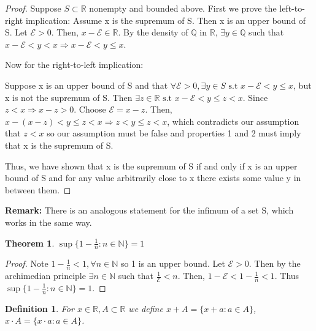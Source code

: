 \documentclass[12pt]{article}
\newtheorem{theorem}{Theorem}
\newtheorem{definition}{Definition}
\begin{document}
\begin{proof}
    Suppose \(S \subset \mathbb R\) nonempty and bounded above.  
    First we prove the left-to-right implication:
    Assume x is the supremum of S. Then x is an upper bound of S.  
    Let \(\mathcal E > 0\). Then, 
    \(x - \mathcal E \in \mathbb R\). By the density of \(\mathbb Q\) in \(\mathbb R\), 
    \(\exists y \in \mathbb Q\) such that \(x- \mathcal E < y < x \Rightarrow 
    x - \mathcal E < y \leq x\). 

    \noindent 
    Now for the right-to-left implication: 

    \noindent 
    Suppose x is an upper bound of S and that \(\forall \mathcal E > 0, 
    \exists y \in S \text{ s.t } x - \mathcal E < y \leq x\), but x is not the supremum 
    of S. Then \(\exists z \in \mathbb R \text{ s.t } x-\mathcal E < y \leq z < x\).
    Since \(z < x \Rightarrow x - z > 0\). Choose \(\mathcal E = x-z\). 
    Then, \(x-(x-z) < y \leq z < x \Rightarrow z < y \leq z < x\), which contradicts 
    our assumption that \(z < x\) so our assumption must be false and properties 
    1 and 2 must imply that x is the supremum of S.

    \noindent 
    Thus, we have shown that x is the supremum of S if and only if 
    x is an upper bound of S and for any value arbitrarily close to x there exists 
    some value y in between them.
    
\end{proof}

\noindent 
\textbf{Remark:}
There is an analogous statement for the infimum of a set S, which works in the same way.

\break
\begin{theorem}
    \(\sup\{1-\frac{1}{n} : n \in \mathbb N\} = 1\)
\end{theorem}

\begin{proof}
    Note \(1 - \frac{1}{n} < 1, \forall n \in \mathbb N\) so 1 is an upper bound. 
    Let \(\mathcal E > 0\). Then by the archimedian principle \(\exists n \in \mathbb N\) 
    such that \(\frac{1}{\mathcal E} < n\). 
    Then, \(1 - \mathcal E < 1 - \frac{1}{n} < 1\). 
    Thus \(\sup\{1-\frac{1}{n} : n \in \mathbb N\} = 1\). 
\end{proof}

\begin{definition}
    For \(x \in \mathbb R, A \subset \mathbb R\) we define 
    \(x + A = \{x + a : a \in A\}\), 
    \(x \cdot A = \{x \cdot a : a \in A\}\).
\end{definition}
\end{document}

